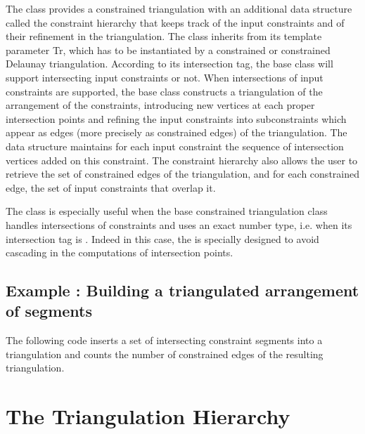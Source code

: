 The class 
provides a constrained triangulation with an additional data
structure called the  constraint hierarchy 
that keeps track of  the input constraints and of their refinement
in the triangulation.
The class 
inherits from its template parameter Tr, which has to be instantiated
by a constrained  or constrained Delaunay  triangulation.
According to its intersection tag, the base class
will support intersecting input constraints or not.
When intersections of input constraints are supported,
the base class constructs a triangulation  of the  arrangement
of the constraints,
introducing new vertices at each proper intersection
points and  refining the input constraints into subconstraints
which appear as  edges (more precisely as constrained edges) of the
triangulation.  The  data structure maintains for each 
input constraint
the sequence of intersection vertices added on this constraint.
The constraint hierarchy also allows the user to retrieve the set
of constrained edges of the triangulation, and for each
constrained edge,  the set of input constraints that overlap it.

The class 
is especially useful when the base constrained triangulation class
handles intersections of constraints and uses an exact number type,
i.e. when its intersection tag is .
Indeed in this case, the 
is specially designed to avoid cascading in the computations of
intersection  points.

\subsection{Example : Building a triangulated arrangement of segments}

The following code inserts a set of intersecting constraint segments
into a triangulation 
and counts the number of constrained edges of the
resulting triangulation.






\section{The Triangulation Hierarchy}
\label{Section_2D_Triangulations_Hierarchy}


